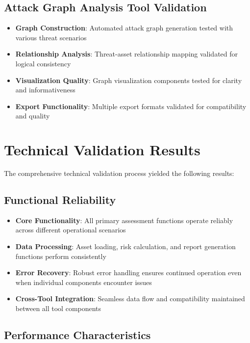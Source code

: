 \documentclass[binding=0.6cm]{sapthesis}
\begin{document}
\subsection{Attack Graph Analysis Tool Validation}

\begin{itemize}
    \item \textbf{Graph Construction}: Automated attack graph generation tested with various threat scenarios
    \item \textbf{Relationship Analysis}: Threat-asset relationship mapping validated for logical consistency
    \item \textbf{Visualization Quality}: Graph visualization components tested for clarity and informativeness
    \item \textbf{Export Functionality}: Multiple export formats validated for compatibility and quality
\end{itemize}

\section{Technical Validation Results}

The comprehensive technical validation process yielded the following results:

\subsection{Functional Reliability}

\begin{itemize}
    \item \textbf{Core Functionality}: All primary assessment functions operate reliably across different operational scenarios
    \item \textbf{Data Processing}: Asset loading, risk calculation, and report generation functions perform consistently
    \item \textbf{Error Recovery}: Robust error handling ensures continued operation even when individual components encounter issues
    \item \textbf{Cross-Tool Integration}: Seamless data flow and compatibility maintained between all tool components
\end{itemize}

\subsection{Performance Characteristics}
\end{document}
